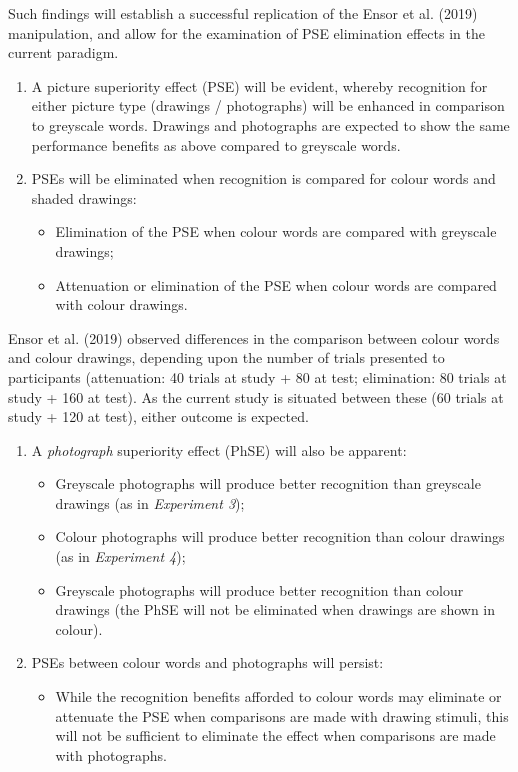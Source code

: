 \documentclass[
  11pt,
]{article}
\providecommand{\tightlist}{%
  \setlength{\itemsep}{0pt}\setlength{\parskip}{0pt}}
\begin{document}
Such findings will establish a successful replication of the Ensor et
al. (2019) manipulation, and allow for the examination of PSE
elimination effects in the current paradigm.

\begin{enumerate}
\def\labelenumi{\arabic{enumi}.}
\setcounter{enumi}{1}
\item
  A picture superiority effect (PSE) will be evident, whereby
  recognition for either picture type (drawings / photographs) will be
  enhanced in comparison to greyscale words. Drawings and photographs
  are expected to show the same performance benefits as above compared
  to greyscale words.
\item
  PSEs will be eliminated when recognition is compared for colour words
  and shaded drawings:

  \begin{itemize}
  \tightlist
  \item
    Elimination of the PSE when colour words are compared with greyscale
    drawings;
  \item
    Attenuation or elimination of the PSE when colour words are compared
    with colour drawings.
  \end{itemize}
\end{enumerate}

Ensor et al. (2019) observed differences in the comparison between
colour words and colour drawings, depending upon the number of trials
presented to participants (attenuation: 40 trials at study + 80 at test;
elimination: 80 trials at study + 160 at test). As the current study is
situated between these (60 trials at study + 120 at test), either
outcome is expected.

\begin{enumerate}
\def\labelenumi{\arabic{enumi}.}
\setcounter{enumi}{3}
\tightlist
\item
  A \emph{photograph} superiority effect (PhSE) will also be apparent:

  \begin{itemize}
  \tightlist
  \item
    Greyscale photographs will produce better recognition than greyscale
    drawings (as in \emph{Experiment 3});
  \item
    Colour photographs will produce better recognition than colour
    drawings (as in \emph{Experiment 4});
  \item
    Greyscale photographs will produce better recognition than colour
    drawings (the PhSE will not be eliminated when drawings are shown in
    colour).
  \end{itemize}
\item
  PSEs between colour words and photographs will persist:

  \begin{itemize}
  \tightlist
  \item
    While the recognition benefits afforded to colour words may
    eliminate or attenuate the PSE when comparisons are made with
    drawing stimuli, this will not be sufficient to eliminate the effect
    when comparisons are made with photographs.
  \end{itemize}
\end{enumerate}
\end{document}
